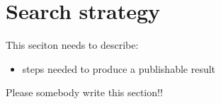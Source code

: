 \section{Search strategy}
\label{sec:strategy}


This seciton needs to describe:

\begin{itemize}
 \item steps needed to produce a publishable result
\end{itemize}

Please somebody write this section!!

